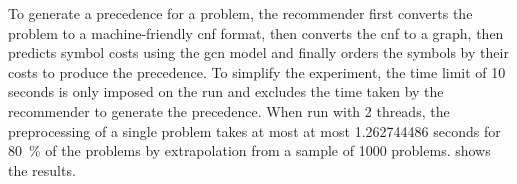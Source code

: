 To generate a precedence for a problem,
the recommender first converts the problem to a machine-friendly \gls{cnf} format,
then converts the \gls{cnf} to a graph,
then predicts symbol costs using the \gls{gcn} model
and finally orders the symbols by their costs to produce the precedence.
To simplify the experiment, the time limit of 10 seconds is only imposed on the \Vampire{} run
and excludes the time taken by the recommender to generate the precedence.
When run with 2 threads,
the preprocessing of a single problem
takes at most at most \num[round-mode=places,round-precision=2]{1.262744486} seconds
for \SI{80}{\percent} of the problems
by extrapolation from a sample of \num{1000} problems.
 shows the results.


